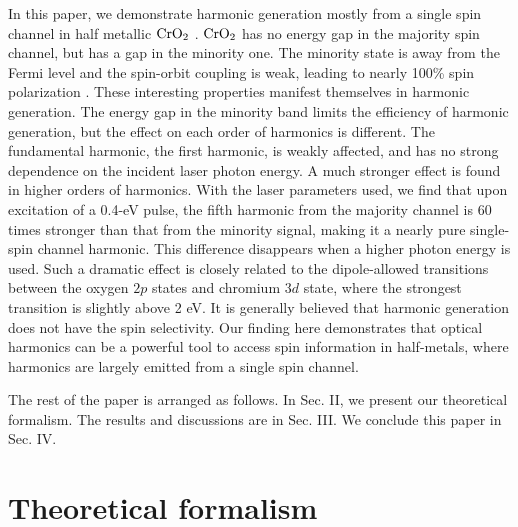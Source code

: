 \documentclass[checkin,showpacs,psfig,aps,pra]{revtex4}
\newcommand{\Cr}{$\rm CrO_{2}$ }
\newcommand{\clr}{}
\begin{document}
In this paper, we demonstrate harmonic generation {mostly} from a
single spin channel in half metallic \Cr \cite{schwarz1986,coey}.  \Cr
has no energy gap in the majority spin channel, but has a gap in the
minority one.  The minority state is away from the Fermi level and the
spin-orbit coupling is weak, leading to nearly 100\% spin polarization
\cite{soulen1998}.  These interesting properties manifest themselves
in harmonic generation. The energy gap in the minority band limits the
efficiency of harmonic generation, but the effect on each order of
harmonics is different. The fundamental harmonic, the first harmonic,
is weakly affected, and has no strong dependence on the incident laser
photon energy. A much stronger effect is found in higher orders of
harmonics. With the laser parameters used, we find that upon
excitation of a 0.4-eV pulse, the fifth harmonic from the majority
channel is 60 times stronger than that from the minority signal,
making it a nearly pure single-spin channel harmonic. This difference
disappears when a higher photon energy is used. Such a dramatic effect
is closely related to the dipole-allowed transitions between the
oxygen $2p$ states and chromium $3d$ state, where the strongest
transition is slightly above 2 eV. It is generally believed that
harmonic generation does not have the spin selectivity.  Our finding
here demonstrates that optical harmonics can be a powerful tool to
access spin information in half-metals, where harmonics are {\clr
  largely} emitted from a single spin channel.


{The rest of the paper is arranged as follows. In Sec. II, we present
our theoretical formalism. The results and discussions are in Sec.
III. We conclude this paper in Sec. IV. }

\section{Theoretical formalism}

\newcommand{\ik}{i{\bf k}}
\newcommand{\jk}{j{\bf k}}

\newcommand{\rr}{{\bf r}}
\end{document}
